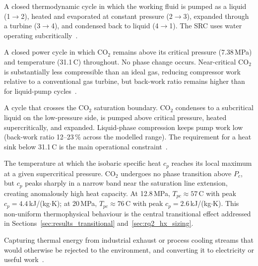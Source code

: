 \documentclass[12pt,a4paper]{report}
\begin{document}
\begin{description}[leftmargin=2em,style=nextline]\sloppy

\item[\textbf{Rankine Cycle (RC):}]
A closed thermodynamic cycle in which the working fluid is pumped as a
liquid (1$\to$2), heated and evaporated at constant pressure (2$\to$3),
expanded through a turbine (3$\to$4), and condensed back to liquid
(4$\to$1). The SRC uses water operating subcritically~\cite{Moran2018}.

\item[\textbf{Supercritical CO$_2$ (sCO$_2$) Brayton Cycle:}]
A closed power cycle in which CO$_2$ remains above its critical pressure
(7.38\,MPa) and temperature (31.1\,\textdegree C) throughout. No phase
change occurs. Near-critical CO$_2$ is substantially less compressible than
an ideal gas, reducing compressor work relative to a conventional gas
turbine, but back-work ratio remains higher than for liquid-pump
cycles~\cite{Dostal2004,Crespi2017}.

\item[\textbf{Transcritical CO$_2$ (tCO$_2$) Rankine Cycle:}]
A cycle that crosses the CO$_2$ saturation boundary. CO$_2$ condenses to a
subcritical liquid on the low-pressure side, is pumped above critical
pressure, heated supercritically, and expanded. Liquid-phase compression
keeps pump work low (back-work ratio 12--23\,\% across the modelled range).
The requirement for a heat sink below 31.1\,\textdegree C is the main
operational constraint~\cite{Jiang2023,Lee2023}.

\item[\textbf{Pseudo-Critical Temperature ($T_{pc}$):}]
The temperature at which the isobaric specific heat $c_p$ reaches its local
maximum at a given supercritical pressure. CO$_2$ undergoes no phase
transition above $P_c$, but $c_p$ peaks sharply in a narrow band near the
saturation line extension, creating anomalously high heat capacity. At
12.8\,MPa, $T_{pc} \approx 57$\,\textdegree C with peak $c_p =
4.4$\,kJ/(kg$\cdot$K); at 20\,MPa, $T_{pc} \approx 76$\,\textdegree C
with peak $c_p = 2.6$\,kJ/(kg$\cdot$K). This non-uniform thermophysical
behaviour is the central transitional effect addressed in
Sections~\ref{sec:results_transitional} and~\ref{sec:rq2_hx_sizing}.

\item[\textbf{Waste Heat Recovery (WHR):}]
Capturing thermal energy from industrial exhaust or process cooling streams
that would otherwise be rejected to the environment, and converting it to
electricity or useful work~\cite{Papapetrou2018}.


\end{description}
\end{document}

